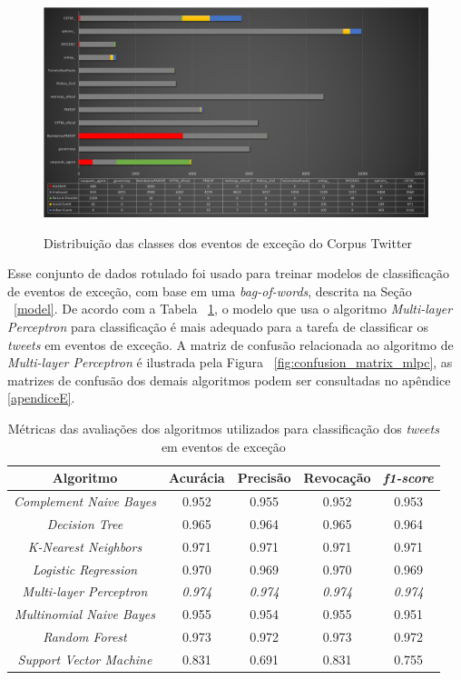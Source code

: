 \documentclass[
	12pt,				%
	oneside,			%
	a4paper,			%
	english,			%
	brazil				%
	]{abntex2ppgsi}
\begin{document}
\begin{figure}[!htb]
	\centering
 	  \caption{Distribuição das classes dos eventos de exceção do Corpus Twitter}
		\includegraphics[width=1\linewidth]{images/tweets_distribution.png}
	\label{fig:tweets_distribution}
\end{figure}

Esse conjunto de dados rotulado foi usado para treinar modelos de classificação de eventos de exceção, com base em uma \textit{bag-of-words}, descrita na Seção ~\ref{model}. De acordo com a Tabela ~\ref{tab:metrics}, o modelo que usa o algoritmo \textit{Multi-layer Perceptron} para classificação é mais adequado para a tarefa de classificar os \textit{tweets} em eventos de exceção. A matriz de confusão relacionada ao algoritmo de \textit{Multi-layer Perceptron} é ilustrada pela Figura ~\ref{fig:confusion_matrix_mlpc}, as matrizes de confusão dos demais algoritmos podem ser consultadas no apêndice \ref{apendiceE}.

\begin{table}[!htb]
\centering
\caption {Métricas das avaliações dos algoritmos utilizados para classificação dos \textit{tweets} em eventos de exceção}
\label {tab:metrics}
\begin{tabular}{c|c|c|c|c}
\hline
\textbf{Algoritmo} & \textbf{Acurácia} & \textbf{Precisão} & \textbf{Revocação} & \textbf{\textit{f1-score}} \\
\hline
\textit{Complement Naive Bayes} & 0.952 & 0.955 & 0.952 & 0.953 \\
\hline
\textit{Decision Tree} & 0.965 & 0.964 & 0.965 & 0.964 \\
\hline
\textit{K-Nearest Neighbors} & 0.971 & 0.971 & 0.971 & 0.971 \\
\hline
\textit{Logistic Regression} & 0.970 & 0.969 & 0.970 & 0.969 \\
\hline
\textit{Multi-layer Perceptron} & \textit{0.974} & \textit{0.974} & \textit{0.974} & \textit{0.974} \\
\hline
\textit{Multinomial Naive Bayes} & 0.955 & 0.954 & 0.955 & 0.951 \\
\hline
\textit{Random Forest} & 0.973 & 0.972 & 0.973 & 0.972 \\
\hline
\textit{Support Vector Machine} & 0.831 & 0.691 & 0.831 & 0.755 \\
\hline
\end{tabular}
\end{table}
\end{document}
